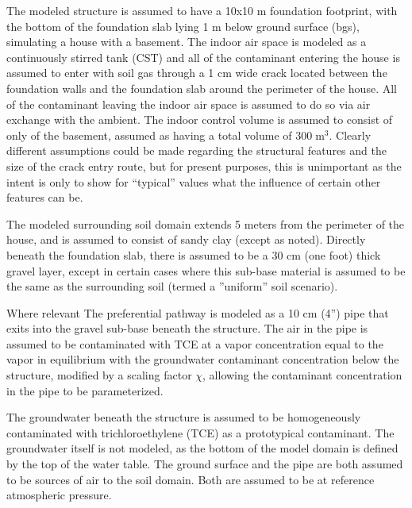 \documentclass[journal=esthag,manuscript=article]{achemso}
\begin{document}
The modeled structure is assumed to have a 10x10 m foundation footprint, with the bottom of the foundation slab lying 1 m below ground surface (bgs), simulating a house with a basement.
The indoor air space is modeled as a continuously stirred tank (CST)\cite{u.s._environmental_protection_agency_oswer_2015} and all of the contaminant entering the house is assumed to enter with soil gas through a 1 cm wide crack located between the foundation walls and the foundation slab around the perimeter of the house.
All of the contaminant leaving the indoor air space is assumed to do so via air exchange with the ambient.
The indoor control volume is assumed to consist of only of the basement, assumed as having a total volume of $300 \; \mathrm{m^3}$.
Clearly different assumptions could be made regarding the structural features and the size of the crack entry route, but for present purposes, this is unimportant as the intent is only to show for “typical” values what the influence of certain other features can be. \par

The modeled surrounding soil domain extends 5 meters from the perimeter of the house, and is assumed to consist of sandy clay (except as noted).
Directly beneath the foundation slab, there is assumed to be a 30 cm (one foot) thick gravel layer, except in certain cases where this sub-base material is assumed to be the same as the surrounding soil (termed  a ”uniform” soil scenario). \par

Where relevant The preferential pathway is modeled as a 10 cm (4”) pipe that exits into the gravel sub-base beneath the structure.
The air in the pipe is assumed to be contaminated with TCE at a vapor concentration equal to the vapor in equilibrium with the groundwater contaminant concentration below the structure, modified by a scaling factor $\chi$, allowing the contaminant concentration in the pipe to be parameterized. \par

The groundwater beneath the structure is assumed to be homogeneously contaminated with trichloroethylene (TCE) as a prototypical contaminant.
The groundwater itself is not modeled, as the bottom of the model domain is defined by the top of the water table.
The ground surface and the pipe are both assumed to be sources of air to the soil domain.
Both are assumed to be at reference atmospheric pressure. \par
\end{document}
